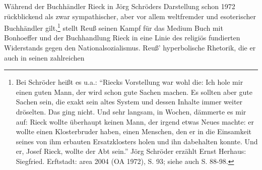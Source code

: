 \documentclass[a4paper,
fontsize=11pt,
oneside,
numbers=noperiodatend,
parskip=half-,
bibliography=totoc,
final
]{scrartcl}
\begin{document}
Während der Buchhändler Rieck in Jörg Schröders Darstellung schon 1972
rückblickend als zwar sympathischer, aber vor allem weltfremder und
esoterischer Buchhändler gilt,\footnote{Bei Schröder heißt es u.a.:
  \enquote{Riecks Vorstellung war wohl die: Ich hole mir einen guten
  Mann, der wird schon gute Sachen machen. Es sollten aber gute Sachen
  sein, die exakt sein altes System und dessen Inhalte immer weiter
  dröselten. Das ging nicht. Und sehr langsam, in Wochen, dämmerte es
  mir auf: Rieck wollte überhaupt keinen Mann, der irgend etwas Neues
  machte: er wollte einen Klosterbruder haben, einen Menschen, den er in
  die Einsamkeit seines von ihm erbauten Ersatzklosters holen und ihn
  dabehalten konnte. Und er, Josef Rieck, wollte der Abt sein.} Jörg
  Schröder erzählt Ernst Herhaus: Siegfried. Erftstadt: area 2004 (OA
  1972), S. 93; siehe auch S. 88-98.} stellt Reuß seinen Kampf für das
Medium Buch mit Bonhoeffer und der Buchhandlung Rieck in eine Linie des
religiös fundierten Widerstands gegen den Nationalsozialismus. Reuß'
hyperbolische Rhetorik, die er auch in seinen zahlreichen
\end{document}
